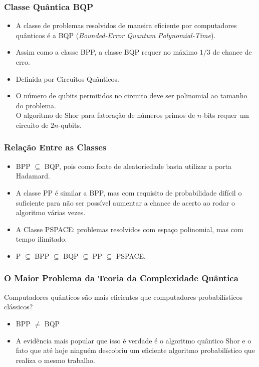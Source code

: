 \documentclass{beamer}
\begin{document}
\begin{frame}
\frametitle{Classe Quântica BQP} 
\begin{itemize}
  \item A classe de problemas resolvidos de maneira eficiente por
  computadores quânticos é a BQP (\textit{Bounded-Error Quantum
    Polynomial-Time}).
  \item Assim como a classe BPP, a classe BQP requer no máximo $1/3$ de
  chance de erro.
  \item Definida por Circuitos Quânticos.
  \item O número de qubits permitidos no circuito deve ser polinomial
    ao tamanho do problema.\\ O algoritmo de Shor para
    fatoração de números primos de $n$-bits requer um circuito de
    $2n$-qubits.
\end{itemize}
\end{frame}

\begin{frame}
\frametitle{Relação Entre as Classes} 
\begin{itemize}
  \item BPP $\subseteq$ BQP, pois como fonte de aleatoriedade basta utilizar a porta Hadamard.
  \item A classe PP é similar a BPP, mas com requisito de probabilidade
  difícil o suficiente para não ser possível aumentar a chance de
  acerto ao rodar o algoritmo várias vezes.
  \item A Classe PSPACE: problemas resolvidos com espaço polinomial,
  mas com tempo ilimitado.
  \item P $\subseteq$ BPP $\subseteq$ BQP $\subseteq$ PP $\subseteq$ PSPACE.
\end{itemize}
\end{frame}

\begin{frame}
\frametitle{\small{O Maior Problema da Teoria da Complexidade Quântica}} 
\begin{centering}
\large{Computadores quânticos são mais eficientes que computadores probabilísticos clássicos?}
\end{centering}
\begin{itemize}
  \item BPP $\not =$ BQP
  \item A evidência mais popular que isso é verdade é o algoritmo
  quântico Shor e o fato que até hoje ninguém descobriu um eficiente
  algoritmo probabilístico que realiza o mesmo trabalho.
\end{itemize}
\end{frame}
\end{document}
